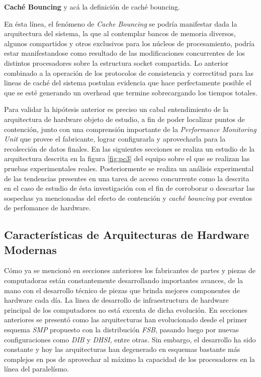 \begin{defn} \textbf{Caché Bouncing} y acá la definición de caché bouncing.
\end{defn}

En ésta línea, el fenómeno de \emph{Cache Bouncing} se podría manifestar dada la arquitectura del sistema, la que al contemplar bancos de memoria diversos, algunos compartidos y otros exclusivos para los núcleos de procesamiento, podría estar manifestandose como resultado de las modificaciones concurrentes de los distintos procesadores sobre la estructura socket compartida. Lo anterior combinado a la operación de los protocolos de consistencia y correctitud para las lineas de caché del sistema postulan evidencia que hace perfectamente posible el que se esté generando un overhead que termine sobrecargando los tiempos totales.

Para validar la hipótesis anterior es preciso un cabal entendimiento de la arquitectura de hardware objeto de estudio, a fin de poder localizar puntos de contención, junto con una comprensión importante de la \emph{Performance Monitoring Unit} que provee el fabricante, lograr configurarla y aprovecharla para la recolección de datos finales. En las siguientes secciones se realiza un estudio de la arquitectura descrita en la figura \ref{fig:pc3} del equipo sobre el que se realizan las pruebas experimentales reales. Posteriormente se realiza un análisis experimental de las tendencias presentes en una tarea de acceso concurrente como la descrita en el caso de estudio de ésta investigación con el fin de corroborar o descartar las sospechas ya mencionadas del efecto de contención y \emph{caché bouncing} por eventos de perfomance de hardware.

\subsection{Características de Arquitecturas de Hardware Modernas}
Cómo ya se mencionó en secciones anteriores los fabricantes de partes y piezas de computadoras están constantemente desarrollando importantes avances, de la mano con el desarrollo técnico de piezas que brinda mejores componentes de hardware cada día. La linea de desarrollo de infraestructura de hardware principal de los computadores no está excenta de dicha evolución. En secciones anteriores se presentó como las arquitecturas han evolucionado desde el primer esquema \emph{SMP} propuesto con la distribución \emph{FSB}, pasando luego por nuevas configuraciones como \emph{DIB} y \emph{DHSI}, entre otras. Sin embargo, el desarrollo ha sido constante y hoy las arquitecturas han degenerado en esquemas bastante más complejos en pos de aprovechar al máximo la capacidad de los procesadores en la línea del paralelísmo.

